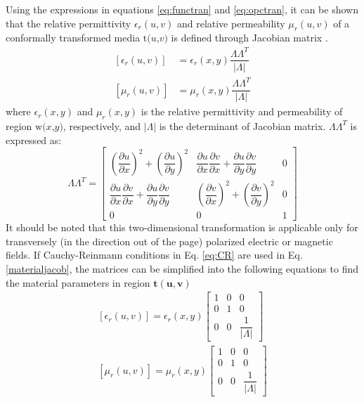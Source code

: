 %
Using the expressions in equations \ref{eq:functran} and \ref{eq:opctran}, it can be shown that the relative permittivity $\epsilon_r(u,v)$ and relative permeability $\mu_r(u,v)$ of a conformally transformed media $\mathrm{t}(u$,$v)$ is defined through Jacobian matrix \cite{Pendry2006}.
\begin{subequations}
	\begin{align}
		[\epsilon_r(u,v)] &= \epsilon_r(x,y) \dfrac{\Lambda \Lambda^{T}}{|\Lambda|}\\
		[\mu_r(u,v)] & = \mu_r(x,y) \dfrac{\Lambda \Lambda^{T}}{|\Lambda|}
	\end{align}
\end{subequations}
where $\epsilon_r(x,y)$ and $\mu_r(x,y)$ is the relative permittivity and permeability of region $\mathrm{w}(x$,$y)$, respectively, and $|\Lambda|$ is the determinant of Jacobian matrix. $\Lambda \Lambda^{T}$ is expressed as:
\begin{equation} \label{materialjacob}
\Lambda \Lambda^{T} = \begin{bmatrix}
		\left(\dfrac{\partial u}{\partial x}\right)^2 + \left(\dfrac{\partial u}{\partial y} \right)^2 & \dfrac{\partial u}{\partial x}\dfrac{\partial v}{\partial x} +\dfrac{\partial u}{\partial y}\dfrac{\partial v}{\partial y} & 0 \\
		\dfrac{\partial u}{\partial x}\dfrac{\partial v}{\partial x} +\dfrac{\partial u}{\partial y}\dfrac{\partial v}{\partial y} & \left(\dfrac{\partial v}{\partial x}\right)^2 + \left(\dfrac{\partial v}{\partial y} \right)^2 & 0 \\
		0                             & 0                             & 1   
	\end{bmatrix}
\end{equation} 
It should be noted that this two-dimensional transformation is applicable only for transversely (in the direction out of the page) polarized electric or magnetic fields. If Cauchy-Reinmann conditions in Eq. \ref{eq:CR} are used in Eq. \ref{materialjacob}, the matrices can be simplified into the following equations to find the material parameters in region $\mathbf{t(u,v)}$
\begin{subequations}\label{matpar}	
	\begin{align} 
		[\epsilon_r(u,v)] = \epsilon_r(x,y)
		\begin{bmatrix}
			1 & 0 & 0 \\
			0 & 1 & 0 \\
			0 & 0 & \dfrac{1}{|\Lambda|}   
		\end{bmatrix} \\
		[\mu_r(u,v)] =  \mu_r(x,y)
		\begin{bmatrix}
			1 & 0 & 0 \\
			0 & 1 & 0 \\
			0 & 0 & \dfrac{1}{|\Lambda|}   
		\end{bmatrix}
	\end{align}	
\end{subequations}
